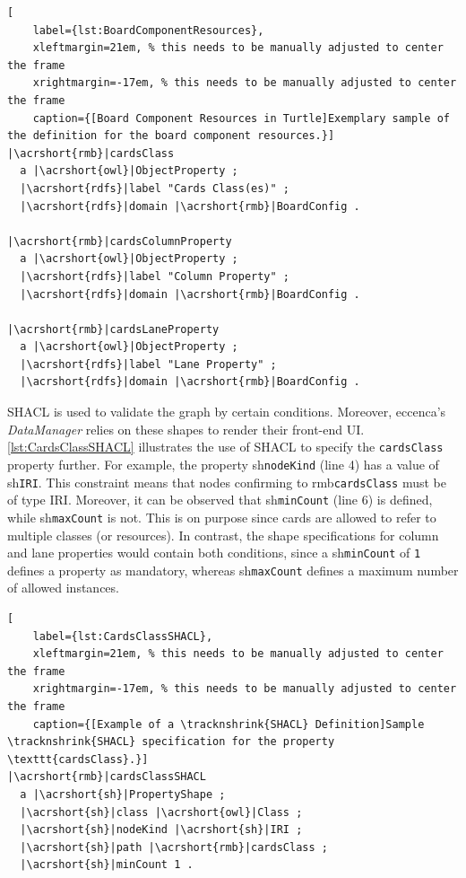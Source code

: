\begin{spacing}{0.9}
    \lstset{language=N3,escapechar=|}
    \begin{lstlisting}[
    label={lst:BoardComponentResources},
    xleftmargin=21em, % this needs to be manually adjusted to center the frame
    xrightmargin=-17em, % this needs to be manually adjusted to center the frame
    caption={[Board Component Resources in Turtle]Exemplary sample of the definition for the board component resources.}]
|\acrshort{rmb}|cardsClass
  a |\acrshort{owl}|ObjectProperty ;
  |\acrshort{rdfs}|label "Cards Class(es)" ;
  |\acrshort{rdfs}|domain |\acrshort{rmb}|BoardConfig .
  
|\acrshort{rmb}|cardsColumnProperty
  a |\acrshort{owl}|ObjectProperty ;
  |\acrshort{rdfs}|label "Column Property" ;
  |\acrshort{rdfs}|domain |\acrshort{rmb}|BoardConfig .
  
|\acrshort{rmb}|cardsLaneProperty
  a |\acrshort{owl}|ObjectProperty ;
  |\acrshort{rdfs}|label "Lane Property" ;
  |\acrshort{rdfs}|domain |\acrshort{rmb}|BoardConfig .
\end{lstlisting}
\end{spacing}


\noindent \acrshort*{SHACL} is used to validate the graph by certain conditions. Moreover, eccenca’s \textit{DataManager} relies on these shapes to render their front-end \acrshort*{UI}. \autoref{lst:CardsClassSHACL} illustrates the use of \acrshort*{SHACL} to specify the \texttt{cardsClass} property further. For example, the property \acrshort{sh}\texttt{nodeKind} (line 4) has a value of \acrshort{sh}\texttt{IRI}. This constraint means that nodes confirming to \acrshort{rmb}\texttt{cardsClass} must be of type \acrshort*{IRI}. Moreover, it can be observed that \acrshort{sh}\texttt{minCount} (line 6) is defined, while \acrshort{sh}\texttt{maxCount} is not. This is on purpose since cards are allowed to refer to multiple classes (or resources). In contrast, the shape specifications for column and lane properties would contain both conditions, since a \acrshort{sh}\texttt{minCount} of \texttt{1} defines a property as mandatory, whereas \acrshort{sh}\texttt{maxCount} defines a maximum number of allowed instances.


\begin{spacing}{0.9}
    \lstset{language=N3,escapechar=|}
    \begin{lstlisting}[
    label={lst:CardsClassSHACL},
    xleftmargin=21em, % this needs to be manually adjusted to center the frame
    xrightmargin=-17em, % this needs to be manually adjusted to center the frame
    caption={[Example of a \tracknshrink{SHACL} Definition]Sample \tracknshrink{SHACL} specification for the property \texttt{cardsClass}.}]
|\acrshort{rmb}|cardsClassSHACL
  a |\acrshort{sh}|PropertyShape ;
  |\acrshort{sh}|class |\acrshort{owl}|Class ;
  |\acrshort{sh}|nodeKind |\acrshort{sh}|IRI ;
  |\acrshort{sh}|path |\acrshort{rmb}|cardsClass ;
  |\acrshort{sh}|minCount 1 .
\end{lstlisting}
\end{spacing}

